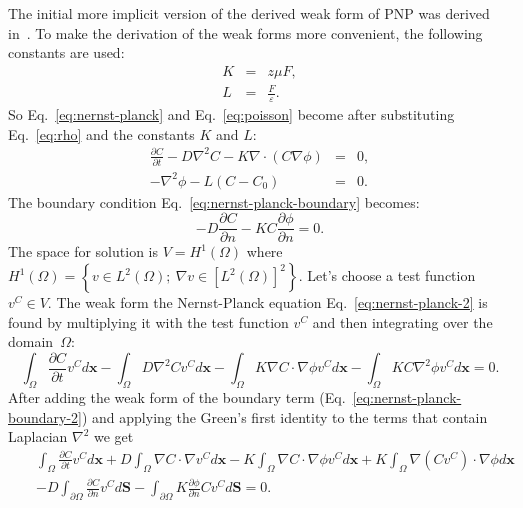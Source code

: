 The initial more implicit version of the derived weak form of PNP
was derived in~\cite{pugal2010spie}.
To make the derivation of the weak forms more convenient, the following
constants are used: 
\begin{eqnarray}
  K & = &z \mu F,\\
  L&=&\frac{F}{\varepsilon}.
  \label{eq:KL}
\end{eqnarray}
So Eq.~\eqref{eq:nernst-planck} and Eq.~\eqref{eq:poisson} become after 
substituting Eq.~\eqref{eq:rho} and the constants $K$ and $L$:
\begin{eqnarray}
  \frac{\partial C}{\partial t}-D\nabla^2 C-K\nabla\cdot \left(C\nabla\phi\right)&=&0,\label{eq:nernst-planck-2}\\
  -\nabla^2\phi-L\left(C-C_{0}\right)&=&0.\label{eq:poisson-2}
\end{eqnarray}
The boundary condition Eq.~\eqref{eq:nernst-planck-boundary} becomes:
\begin{equation}
  -D\frac{\partial C}{\partial n}-KC\frac{\partial\phi}{\partial n}=0.
  \label{eq:nernst-planck-boundary-2}
\end{equation}
The space for solution is $V=H^1\left(\Omega\right)$ where 
$H^1\left(\Omega\right)=\left\{v\in L^2\left(\Omega\right);\ \nabla v \in \left[L^2\left(\Omega\right)\right]^2\right\}$.
Let's choose a test function $v^C\in V$.
The weak form the Nernst-Planck equation Eq.~\eqref{eq:nernst-planck-2}
is found by multiplying it with the test function $v^C$ and then integrating over the domain~$\Omega$:
\begin{equation}
  \int_{\Omega}\frac{\partial C}{\partial t}v^C d\mathbf{x}
  -\int_{\Omega}D\nabla^2Cv^C d\mathbf{x}-\int_{\Omega}K\nabla C\cdot
  \nabla\phi v^C d\mathbf{x} - \int_{\Omega}KC\nabla^2\phi v^C d\mathbf{x}=0.
  \label{eq:nernst-planck-weak1}
\end{equation}
After adding the weak form of the boundary term 
(Eq.~\eqref{eq:nernst-planck-boundary-2}) and applying
the Green's first identity to the terms that contain Laplacian $\nabla^2$ we get
\begin{eqnarray}
 && \int_{\Omega}\frac{\partial C}{\partial t}v^C d\mathbf{x}+
  D\int_{\Omega}\nabla C\cdot\nabla v^C d\mathbf{x}-
  K\int_{\Omega}\nabla C \cdot \nabla \phi v^C d\mathbf{x}+
  K\int_{\Omega}\nabla\left(Cv^C\right)\cdot \nabla \phi d\mathbf{x}\\
  &&-D\int_{\partial\Omega}\frac{\partial C}{\partial n}v^C d\mathbf{S}-
  \int_{\partial\Omega}K\frac{\partial\phi}{\partial n}Cv^C d\mathbf{S}=0.
  \label{eq:nernst-planck-weak2}
\end{eqnarray}
